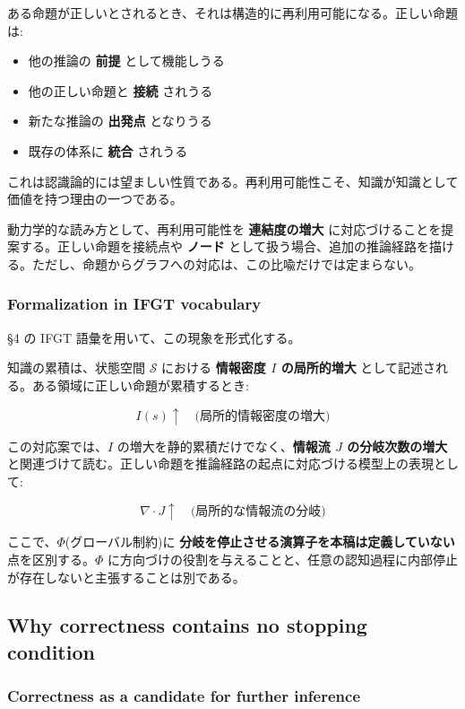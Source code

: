 ある命題が正しいとされるとき、それは構造的に再利用可能になる。正しい命題は:

\begin{itemize}
\item 他の推論の \textbf{前提} として機能しうる
\item 他の正しい命題と \textbf{接続} されうる
\item 新たな推論の \textbf{出発点} となりうる
\item 既存の体系に \textbf{統合} されうる
\end{itemize}

これは認識論的には望ましい性質である。再利用可能性こそ、知識が知識として価値を持つ理由の一つである。

動力学的な読み方として、再利用可能性を \textbf{連結度の増大} に対応づけることを提案する。正しい命題を接続点や \textbf{ノード} として扱う場合、追加の推論経路を描ける。ただし、命題からグラフへの対応は、この比喩だけでは定まらない。

\subsubsection{Formalization in IFGT vocabulary}


\S{}4 の IFGT 語彙を用いて、この現象を形式化する。

知識の累積は、状態空間 $\mathcal{S}$ における \textbf{情報密度 $I$ の局所的増大} として記述される。ある領域に正しい命題が累積するとき:

\[
I(s) \uparrow \quad \text{(局所的情報密度の増大)}
\]

この対応案では、$I$ の増大を静的累積だけでなく、\textbf{情報流 $J$ の分岐次数の増大} と関連づけて読む。正しい命題を推論経路の起点に対応づける模型上の表現として:

\[
\nabla \cdot J \uparrow \quad \text{(局所的な情報流の分岐)}
\]

ここで、$\Phi$(グローバル制約)に \textbf{分岐を停止させる演算子を本稿は定義していない} 点を区別する。$\Phi$ に方向づけの役割を与えることと、任意の認知過程に内部停止が存在しないと主張することは別である。

\subsection{Why correctness contains no stopping condition}


\subsubsection{Correctness as a candidate for further inference}


